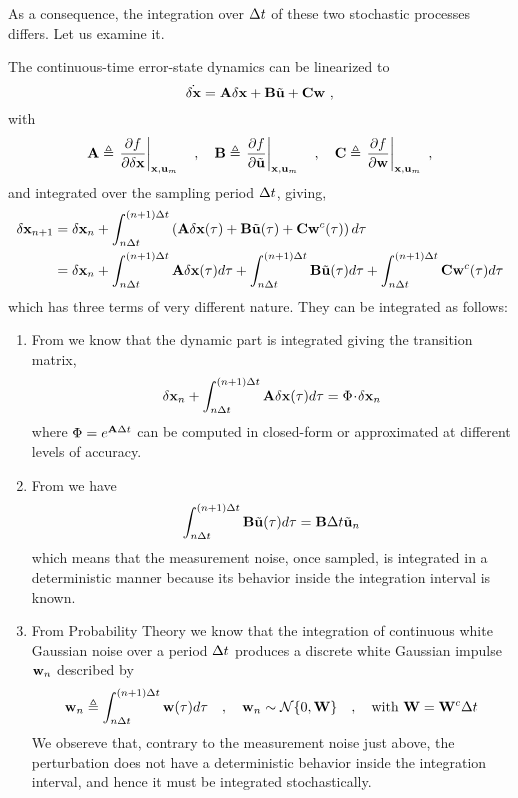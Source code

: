 As a consequence, the integration over $\Delta t$ of these two stochastic processes differs. 
Let us examine it. 

\bigskip
The continuous-time error-state dynamics  can be linearized to
%
\begin{equation}
\dot{\delta{\bf x}} = {\bf A}\delta{\bf x} + {\bf B}\tilde{{\bf u}} + {\bf C} {\bf w}~, \label{equ:contTime}
\end{equation}
%
with 
%
\begin{equation}
{\bf A}\triangleq\left.\frac{\partial f}{\partial\delta{\bf x}}\right|_{{\bf x},{\bf u}_m}\quad,\quad
{\bf B}\triangleq\left.\frac{\partial f}{\partial\tilde{{\bf u}}}\right|_{{\bf x},{\bf u}_m}\quad,\quad
{\bf C}\triangleq\left.\frac{\partial f}{\partial{\bf w}}\right|_{{\bf x},{\bf u}_m}~,
\end{equation}
%
and integrated over the sampling period $\Delta t$, giving,
%
\begin{align}
\delta{\bf x}_{n+1} &= \delta{\bf x}_n 
+ \int_{n\Delta t}^{(n+1)\Delta t} \left(
{\bf A}\delta{\bf x}(\tau) + {\bf B}\tilde{{\bf u}}(\tau) + {\bf C}{\bf w}^c(\tau)
\right) d\tau \\
 &= \delta{\bf x}_n 
+ \int_{n\Delta t}^{(n+1)\Delta t} {\bf A}\delta{\bf x}(\tau)   d\tau
+ \int_{n\Delta t}^{(n+1)\Delta t} {\bf B}\tilde{{\bf u}}(\tau)   d\tau 
+ \int_{n\Delta t}^{(n+1)\Delta t} {\bf C}{\bf w}^c(\tau) d\tau 
\end{align}
%
which has three terms of very different nature. 
They can be integrated as follows:
%
\begin{enumerate}
\item From  we know that the dynamic part is integrated giving the transition matrix,
%
\begin{equation}
\delta{\bf x}_n 
+ \int_{n\Delta t}^{(n+1)\Delta t} {\bf A}\delta{\bf x}(\tau)   d\tau = \Phi\!\cdot\!\delta{\bf x}_n
\end{equation}
%
where $\Phi=e^{{\bf A}\Delta t}$ can be computed in closed-form or approximated at different levels of accuracy.

\item From  we have
%
\begin{equation}
\int_{n\Delta t}^{(n+1)\Delta t} {\bf B}\tilde{{\bf u}}(\tau)   d\tau = {\bf B}\Delta t\tilde{{\bf u}}_n
\end{equation}
%
which means that the measurement noise, once sampled, is integrated in a deterministic manner because its behavior inside the integration interval is known.

\item From Probability Theory we know that the integration of continuous white Gaussian noise over a period $\Delta t$ produces a discrete white Gaussian impulse ${\bf w}_n$ described by
%
\begin{equation}
{\bf w}_n\triangleq\int_{n\Delta t}^{(n+1)\Delta t}{\bf w}(\tau)d\tau 
\quad,\quad
{\bf w}_n \sim \mathcal{N}\{0,{\bf W}\} 
\quad,\quad
 \text{with } {\bf W} = {\bf W}^c\Delta t
\end{equation}
%
We obsereve that, contrary to the measurement noise just above, the perturbation does not have a deterministic behavior inside the integration interval, and hence it must be integrated stochastically.

\end{enumerate}%
